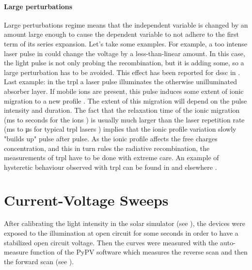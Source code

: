 		\paragraph{Large perturbations} \label{perturbation}
		Large perturbations regime means that the independent variable is changed by an amount large enough to cause the dependent variable to not adhere to the first term of its series expansion.
		Let's take some examples.
		For example, a too intense laser pulse in  could change the voltage by a less\hyp{}than\hyp{}linear amount.
		In this case, the light pulse is not only probing the recombination, but it is adding some, so a large perturbation has to be avoided.
		This effect has been reported for \gls{dssc} in .
		Last example: in the \glsdesc{trpl} a laser pulse illuminates the otherwise unilluminated absorber layer.
		If mobile ions are present, this pulse induces some extent of ionic migration to a new profile \cite{Levine2018}.
		The extent of this migration will depend on the pulse intensity and duration.
		The fact that the relaxation time of the ionic migration (\si{\ms} to seconds for the ions \cite{Jacobs2018}) is usually much larger than the laser repetition rate (\si{\ms} to \si{\us} for typical \gls{trpl} lasers \cite{EdinburghInstruments}) implies that the ionic profile variation slowly "builds up" pulse after pulse.
		As the ionic profile affects the free charges concentration, and this in turn rules the radiative recombination, the measurements of \gls{trpl} have to be done with extreme care.
		An example of hysteretic behaviour observed with \gls{trpl} can be found in  and elsewhere \cite{Chen2015,Chen2017}.

\section{Current-Voltage Sweeps}

	After calibrating the light intensity in the solar simulator (see ), the devices were exposed to the illumination at open circuit for some seconds in order to have a stabilized open circuit voltage.
	Then the curves were measured with the auto-measure function of the PyPV software which measures the reverse scan and then the forward scan (see ).

